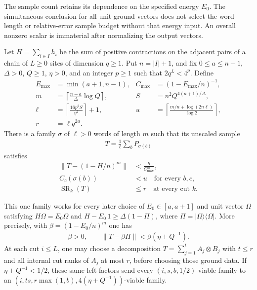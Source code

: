 The sample count retains its dependence on the specified energy $E_0$.
The simultaneous conclusion for all unit ground vectors does not select
the word length or relative-error sample budget without that energy input.
An overall nonzero scalar is immaterial after normalizing the output vectors.

\begin{lemma}
    \label{thm:lvv_interval_power_sampling}
    \leanok
    Let $H=\sum_{i\in I}h_i$ be the sum of positive contractions on the
    adjacent pairs of a chain of $L\ge0$ sites of dimension $q\ge1$.
    Put $n=|I|+1$, and fix $0\le a\le n-1$, $\Delta>0$, $Q\ge1$, $\eta>0$,
    and an integer $p\ge1$ such that $2q^L<4^p$.
    Define
    \begin{align}
        E_{\max}&=\min(a+1,n-1), & C_{\max}&=(1-E_{\max}/n)^{-1},\\
        m&=\left\lceil\frac{n-a}{\Delta}\log Q\right\rceil,
        & S&=n^2Q^{4(a+1)/\Delta},\\
        \ell&=\left\lceil\frac{16p^2S}{\eta^2}\right\rceil+1,
        & u&=\left\lceil\frac{m/n+\log(2n\ell)}{\log2}\right\rceil,\\
        r&=\ell q^{2u}.
        \label{eq:lvv_interval_sampling_parameters}
    \end{align}
    There is a family $\sigma$ of $\ell>0$ words of length $m$ such that
    its unscaled sample
    \begin{align}
        T=\frac1\ell\sum_bP_{\sigma(b)}
        \label{eq:lvv_interval_unscaled_sample}
    \end{align}
    satisfies
    \begin{align}
        \|T-(1-H/n)^m\|&<\frac{\eta}{C_{\max}^m},\\
        C_c(\sigma(b))&<u\quad\text{for every }b,c,\\
        \operatorname{SR}_k(T)&\le r\quad\text{at every cut }k.
        \label{eq:lvv_interval_mean_counts_rank}
    \end{align}

    This one family works for every later choice of $E_0\in[a,a+1]$ and
    unit vector $\Omega$ satisfying
    $H\Omega=E_0\Omega$ and $H-E_0\,1\ge\Delta(1-\Pi)$, where
    $\Pi=|\Omega\rangle\langle\Omega|$.
    More precisely, with $\beta=(1-E_0/n)^m$ one has
    \begin{align}
        \beta>0,\qquad \|T-\beta\Pi\|<\beta(\eta+Q^{-1}).
        \label{eq:lvv_interval_relative_projection}
    \end{align}
    At each cut $i\le L$, one may choose a decomposition
    $T=\sum_{j=1}^{t}A_j\otimes B_j$ with $t\le r$ and all internal
    cut ranks of $A_j$ at most $r$, before choosing those ground data.
    If $\eta+Q^{-1}<1/2$, these same left factors send every
    $(i,s,b,1/2)$-viable family to an
    $(i,ts,r\max(1,b),4(\eta+Q^{-1}))$-viable family.
\end{lemma}
